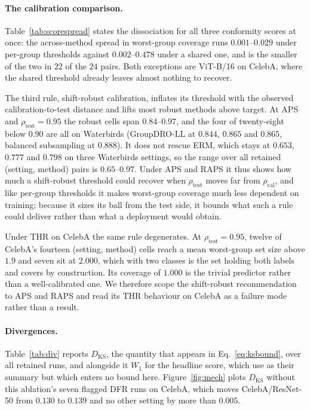 \documentclass[pdflatex,sn-basic]{sn-jnl}%
\theoremstyle{thmstyleone}%
\newcommand{\Wone}{W_1}
\newcommand{\rhocal}{\rho_{\mathrm{cal}}}
\newcommand{\rhotest}{\rho_{\mathrm{test}}}
\begin{document}
\begin{appendices}
\paragraph{The calibration comparison.}
Table~\ref{tab:scorespread} states the dissociation for all three conformity scores at
once: the across-method spread in worst-group coverage runs $0.001$--$0.029$ under per-group
thresholds against $0.002$--$0.478$ under a shared one, and is the smaller of the two in $22$ of
the $24$ pairs. Both exceptions are ViT-B/16 on CelebA, where the shared threshold already leaves
almost nothing to recover.

The third rule, shift-robust calibration, inflates its threshold with the observed
calibration-to-test distance and lifts most robust methods above target. At APS and
$\rhotest=0.95$ the robust cells span $0.84$--$0.97$, and the four of twenty-eight below $0.90$ are all on Waterbirds (GroupDRO-LL at
$0.844$, $0.865$ and $0.865$, balanced subsampling at $0.888$). It does not rescue ERM, which stays at
$0.653$, $0.777$ and $0.798$ on three Waterbirds settings, so the range over all retained (setting,
method) pairs is $0.65$--$0.97$. Under APS and RAPS it thus shows how much a shift-robust threshold
could recover when $\rhotest$ moves far from $\rhocal$, and like per-group thresholds it makes
worst-group coverage much less dependent on training; because it sizes its ball from the test side,
it bounds what such a rule could deliver rather than what a deployment would obtain.

Under THR on CelebA the same rule degenerates. At $\rhotest=0.95$, twelve of CelebA's fourteen
(setting, method) cells reach a mean worst-group set size above $1.9$ and seven sit at $2.000$, which with two classes is
the set holding both labels and covers by construction. Its coverage of $1.000$ is the trivial
predictor rather than a well-calibrated one. We therefore scope the shift-robust recommendation to
APS and RAPS and read its THR behaviour on CelebA as a failure mode rather than a result.

\paragraph{Divergences.} Table~\ref{tab:div} reports $D_{\mathrm{KS}}$, the quantity that appears
in Eq.~\eqref{eq:ksbound}, over all retained runs, and alongside it $\Wone$ for the headline score,
which \citet{burden2026} use as their summary but which enters no bound here. Figure~\ref{fig:mech}
plots $D_{\mathrm{KS}}$ without this ablation's seven flagged DFR runs on CelebA, which moves CelebA/ResNet-50
from $0.130$ to $0.139$ and no other setting by more than $0.005$.


\end{appendices}
\end{document}
